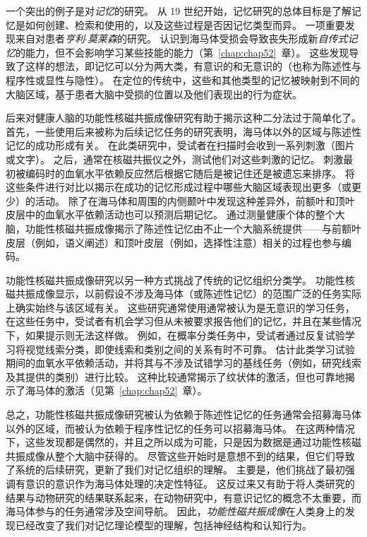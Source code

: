 一个突出的例子是对\textit{记忆}的研究。
从 19 世纪开始，记忆研究的总体目标是了解记忆是如何创建、检索和使用的，以及这些过程是否因记忆类型而异。 
一项重要发现来自对患者\textit{亨利$\cdot$莫莱森}的研究。 
认识到海马体受损会导致丧失形成新\textit{自传式记忆}的能力，但不会影响学习某些技能的能力（第~\ref{chap:chap52}~章）。
这些发现导致了这样的想法，即记忆可以分为两大类，有意识的和无意识的（也称为陈述性与程序性或显性与隐性）。
在定位的传统中，这些和其他类型的记忆被映射到不同的大脑区域，基于患者大脑中受损的位置以及他们表现出的行为症状。


后来对健康人脑的功能性核磁共振成像研究有助于揭示这种二分法过于简单化了。
首先，一些使用后来被称为后续记忆任务的研究表明，海马体以外的区域与陈述性记忆的成功形成有关。
在此类研究中，受试者在扫描时会收到一系列刺激（图片或文字）。
之后，通常在核磁共振仪之外，测试他们对这些刺激的记忆。
刺激最初被编码时的血氧水平依赖反应然后根据它随后是被记住还是被遗忘来排序。
将这些条件进行对比以揭示在成功的记忆形成过程中哪些大脑区域表现出更多（或更少）的活动。
除了在海马体和周围的内侧颞叶中发现这种差异外，前额叶和顶叶皮层中的血氧水平依赖活动也可以预测后期记忆。 
通过测量健康个体的整个大脑，功能性核磁共振成像揭示了陈述性记忆由不止一个大脑系统提供——与前额叶皮层（例如，语义阐述）和顶叶皮层（例如，选择性注意）相关的过程也参与编码。


功能性核磁共振成像研究以另一种方式挑战了传统的记忆组织分类学。
功能性核磁共振成像显示，以前假设不涉及海马体（或陈述性记忆）的范围广泛的任务实际上确实始终与该区域有关。
这些研究通常使用通常被认为是无意识的学习任务，在这些任务中，受试者有机会学习但从未被要求报告他们的记忆，并且在某些情况下，如果提示则无法这样做。
例如，在概率分类任务中，受试者通过反复试验学习将视觉线索分类，即使线索和类别之间的关系有时不可靠。
估计此类学习试验期间的血氧水平依赖活动，并将其与不涉及试错学习的基线任务（例如，研究线索及其提供的类别）进行比较。
这种比较通常揭示了纹状体的激活，但也可靠地揭示了海马体的激活（见第~\ref{chap:chap52}~章）。


总之，功能性核磁共振成像研究被认为依赖于陈述性记忆的任务通常会招募海马体以外的区域，而被认为依赖于程序性记忆的任务可以招募海马体。
在这两种情况下，这些发现都是偶然的，并且之所以成为可能，只是因为数据是通过功能性核磁共振成像从整个大脑中获得的。
尽管这些开始时是意想不到的结果，但它们导致了系统的后续研究，更新了我们对记忆组织的理解。
主要是，他们挑战了最初强调有意识的意识作为海马体处理的决定性特征。
这反过来又有助于将人类研究的结果与动物研究的结果联系起来，在动物研究中，有意识记忆的概念不太重要，而海马体参与的任务通常涉及空间导航。
因此，\textit{功能性磁共振成像}在人类身上的发现已经改变了我们对记忆理论模型的理解，包括神经结构和认知行为。



